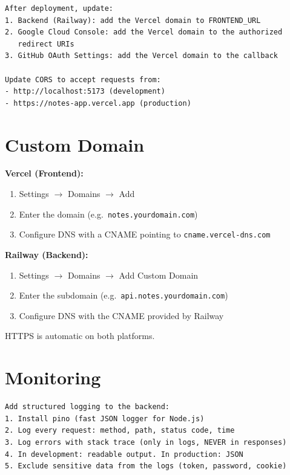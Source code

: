 \begin{praticabox}[title={Practice --- Update CORS and OAuth}]
\begin{lstlisting}[language={}]
After deployment, update:
1. Backend (Railway): add the Vercel domain to FRONTEND_URL
2. Google Cloud Console: add the Vercel domain to the authorized
   redirect URIs
3. GitHub OAuth Settings: add the Vercel domain to the callback

Update CORS to accept requests from:
- http://localhost:5173 (development)
- https://notes-app.vercel.app (production)
\end{lstlisting}
\end{praticabox}

\section{Custom Domain}

\textbf{Vercel (Frontend):}
\begin{enumerate}
  \item Settings $\rightarrow$ Domains $\rightarrow$ Add
  \item Enter the domain (e.g.\ \texttt{notes.yourdomain.com})
  \item Configure DNS with a CNAME pointing to \texttt{cname.vercel-dns.com}
\end{enumerate}

\textbf{Railway (Backend):}
\begin{enumerate}
  \item Settings $\rightarrow$ Domains $\rightarrow$ Add Custom Domain
  \item Enter the subdomain (e.g.\ \texttt{api.notes.yourdomain.com})
  \item Configure DNS with the CNAME provided by Railway
\end{enumerate}

HTTPS is automatic on both platforms.

\section{Monitoring}

\begin{praticabox}[title={Practice --- Production logging}]
\begin{lstlisting}[language={}]
Add structured logging to the backend:
1. Install pino (fast JSON logger for Node.js)
2. Log every request: method, path, status code, time
3. Log errors with stack trace (only in logs, NEVER in responses)
4. In development: readable output. In production: JSON
5. Exclude sensitive data from the logs (token, password, cookie)
\end{lstlisting}
\end{praticabox}

